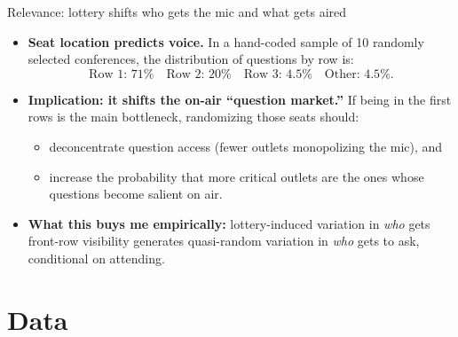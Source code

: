 \documentclass[10pt,aspectratio=169]{beamer}
\begin{document}
\begin{frame}{Relevance: lottery shifts who gets the mic and what gets aired}
\small
\begin{itemize}\setlength\itemsep{0.65em}

  \item \textbf{Seat location predicts voice.}
  In a hand-coded sample of 10 randomly selected conferences, the distribution of questions by row is:
  \[
  \text{Row 1: }71\% \quad\text{Row 2: }20\% \quad\text{Row 3: }4.5\% \quad\text{Other: }4.5\%.
  \]

  \item \textbf{Implication: it shifts the on-air ``question market.''}
  If being in the first rows is the main bottleneck, randomizing those seats should:
  \begin{itemize}\setlength\itemsep{0.35em}
    \item \alert{deconcentrate} question access (fewer outlets monopolizing the mic), and
    \item increase the probability that \alert{more critical outlets} are the ones whose questions become salient on air.
  \end{itemize}

  \item \textbf{What this buys me empirically:}
  lottery-induced variation in \emph{who} gets front-row visibility generates quasi-random variation in \emph{who} gets to ask, conditional on attending.

\end{itemize}
\end{frame}

\section{Data}
\end{document}
